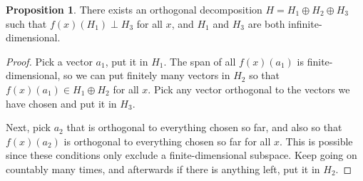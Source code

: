\documentclass{shortart}
\theoremstyle{definition}
\newtheorem*{prop}{Proposition}
\newtheorem*{claim}{Claim}
\newcommand\id{I}
\newcommand\GL{\mathrm{GL}}
\begin{document}
\begin{prop}
  There exists an orthogonal decomposition $H = H_1 \oplus H_2 \oplus H_3$ such that $f(x)(H_1) \perp H_3$ for all $x$, and $H_1$ and $H_3$ are both infinite-dimensional.
\end{prop}
\begin{proof}
  Pick a vector $a_1$, put it in $H_1$. The span of all $f(x)(a_1)$ is finite-dimensional, so we can put finitely many vectors in $H_2$ so that $f(x)(a_1) \in H_1 \oplus H_2$ for all $x$. Pick any vector orthogonal to the vectors we have chosen and put it in $H_3$.

  Next, pick $a_2$ that is orthogonal to everything chosen so far, and also so that $f(x)(a_2)$ is orthogonal to everything chosen so far for all $x$. This is possible since these conditions only exclude a finite-dimensional subspace. Keep going on countably many times, and afterwards if there is anything left, put it in $H_2$.
\end{proof}
%
%
%
%
%
\end{document}
